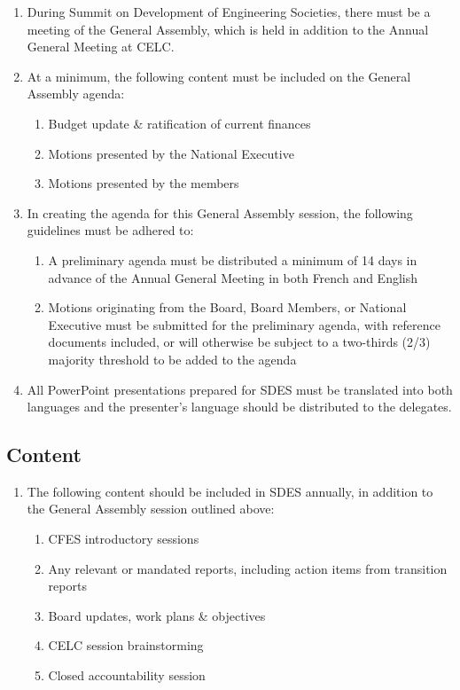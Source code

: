 \begin{enumerate}
 \item
  During Summit on Development of Engineering Societies, there must be a meeting of the General Assembly, which is held in addition to the Annual General Meeting at CELC.
 \item
  At a minimum, the following content must be included on the General Assembly agenda:

  \begin{enumerate}
   \item
    Budget update \& ratification of current finances
   \item
    Motions presented by the National Executive
   \item
    Motions presented by the members

  \end{enumerate}

 \item
  In creating the agenda for this General Assembly session, the following guidelines must be adhered to:
  \begin{enumerate}
   \item
    A preliminary agenda must be distributed a minimum of 14 days in advance of the Annual General Meeting in both French and English
   \item
    Motions originating from the Board, Board Members, or National Executive must be submitted for the preliminary agenda, with reference documents included, or will otherwise be subject to a two-thirds (2/3) majority threshold to be added to the agenda
  \end{enumerate}

 \item
  All PowerPoint presentations prepared for SDES must be translated into both languages and the presenter's language should be distributed to the delegates.

\end{enumerate}

\subsection{Content}
\label{content-1}

\begin{enumerate}
 \item
  The following content should be included in SDES annually, in addition to the General Assembly session outlined above:

  \begin{enumerate}
   \item
    CFES introductory sessions
   \item
    Any relevant or mandated reports, including action items from transition reports
   \item
    Board updates, work plans \& objectives
   \item
    CELC session brainstorming
   \item
    Closed accountability session
  \end{enumerate}

\end{enumerate}
